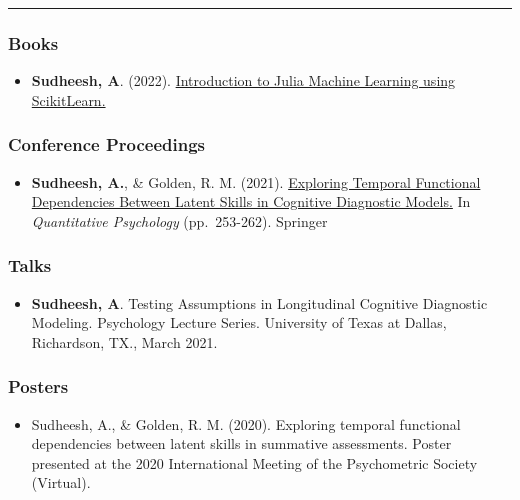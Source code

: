 \documentclass[
  letterpaper,
  DIV=11,
  numbers=noendperiod]{scrartcl}
\providecommand{\tightlist}{%
  \setlength{\itemsep}{0pt}\setlength{\parskip}{0pt}}
\begin{document}
\begin{center}\rule{0.5\linewidth}{0.5pt}\end{center}

\hypertarget{books}{%
\subsubsection{Books}\label{books}}

\begin{itemize}
\tightlist
\item
  \textbf{Sudheesh, A}. (2022).
  \href{https://athulsudheesh.github.io/IJML/}{Introduction to Julia
  Machine Learning using ScikitLearn.}
\end{itemize}

\hypertarget{conference-proceedings}{%
\subsubsection{Conference Proceedings}\label{conference-proceedings}}

\begin{itemize}
\tightlist
\item
  \textbf{Sudheesh, A.}, \& Golden, R. M. (2021).
  \href{https://link.springer.com/chapter/10.1007/978-3-030-74772-5_23}{Exploring
  Temporal Functional Dependencies Between Latent Skills in Cognitive
  Diagnostic Models.} In \emph{Quantitative Psychology} (pp.~253-262).
  Springer
\end{itemize}

\hypertarget{talks}{%
\subsubsection{Talks}\label{talks}}

\begin{itemize}
\tightlist
\item
  \textbf{Sudheesh, A}. Testing Assumptions in Longitudinal Cognitive
  Diagnostic Modeling. Psychology Lecture Series. University of Texas at
  Dallas, Richardson, TX., March 2021.
\end{itemize}

\hypertarget{posters}{%
\subsubsection{Posters}\label{posters}}

\begin{itemize}
\tightlist
\item
  Sudheesh, A., \& Golden, R. M. (2020). Exploring temporal functional
  dependencies between latent skills in summative assessments. Poster
  presented at the 2020 International Meeting of the Psychometric
  Society (Virtual).
\end{itemize}
\end{document}
